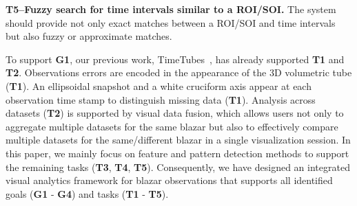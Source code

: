 \noindent\textbf{T5--Fuzzy search for time intervals similar to a ROI/SOI.}
The system should provide not only exact matches between a ROI/SOI and time intervals but also fuzzy or approximate matches. 

To support \textbf{G1}, our previous work, TimeTubes~\cite{Fujishiro2018}, has already supported \textbf{T1} and \textbf{T2}.
Observations errors are encoded in the appearance of the 3D volumetric tube (\textbf{T1}).
An ellipsoidal snapshot and a white cruciform axis appear at each observation time stamp to distinguish missing data (\textbf{T1}).
Analysis across datasets (\textbf{T2}) is supported by visual data fusion, which allows users not only to aggregate multiple datasets for the same blazar but also to effectively compare multiple datasets for the same/different blazar in a single visualization session.
In this paper, we mainly focus on feature and pattern detection methods to support the remaining tasks (\textbf{T3}, \textbf{T4}, \textbf{T5}).
Consequently, we have designed an integrated visual analytics framework for blazar observations that supports all identified goals (\textbf{G1} - \textbf{G4}) and tasks (\textbf{T1} - \textbf{T5}).


